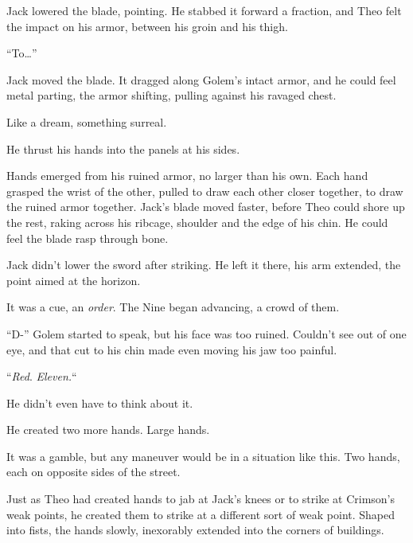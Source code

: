 Jack lowered the blade, pointing.  He stabbed it forward a fraction, and Theo felt the impact on his armor, between his groin and his thigh.



``To\ldots''



Jack moved the blade.  It dragged along Golem's intact armor, and he could feel metal parting, the armor shifting, pulling against his ravaged chest.



Like a dream, something surreal.



He thrust his hands into the panels at his sides.



Hands emerged from his ruined armor, no larger than his own.  Each hand grasped the wrist of the other, pulled to draw each other closer together, to draw the ruined armor together.  Jack's blade moved faster, before Theo could shore up the rest, raking across his ribcage, shoulder and the edge of his chin.  He could feel the blade rasp through bone.



Jack didn't lower the sword after striking.  He left it there, his arm extended, the point aimed at the horizon.



It was a cue, an \emph{order}.  The Nine began advancing, a crowd of them.



``D-'' Golem started to speak, but his face was too ruined.  Couldn't see out of one eye, and that cut to his chin made even moving his jaw too painful.



``\emph{Red}.  \emph{Eleven.}``



He didn't even have to think about it.



He created two more hands.  Large hands.



It was a gamble, but any maneuver would be in a situation like this.  Two hands, each on opposite sides of the street.



Just as Theo had created hands to jab at Jack's knees or to strike at Crimson's weak points, he created them to strike at a different sort of weak point.  Shaped into fists, the hands slowly, inexorably extended into the corners of buildings.



